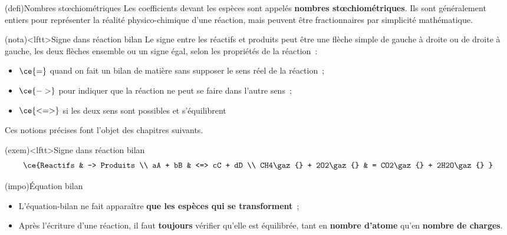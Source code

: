 \documentclass[../../main/main.tex]{subfiles}
\begin{document}
\begin{tcb*}(defi){Nombres stœchiométriques}
	Les coefficients devant les espèces sont appelés \textbf{nombres
		stœchiométriques}. Ils sont généralement entiers pour représenter la réalité
	physico-chimique d'une réaction, mais peuvent être fractionnaires par
	simplicité mathématique.
\end{tcb*}

\begin{tcb}(nota)<lftt>{Signe dans réaction bilan}
	Le signe entre les réactifs et produits
	peut être une flèche simple de gauche à droite ou de droite à gauche,
	les deux flèches ensemble ou un signe égal, selon les propriétés de la
	réaction~:
	\begin{itemize}
		\item $\ce{=}$ quand on fait un bilan de matière sans supposer le sens réel de
		      la réaction~;
		\item $\ce{->}$ pour indiquer que la réaction ne peut se faire dans l'autre
		      sens~;
		\item $\ce{<=>}$ si les deux sens sont possibles et s'équilibrent
	\end{itemize}
	Ces notions précises font l'objet des chapitres suivants.
\end{tcb}

\begin{tcb}(exem)<lftt>{Signe dans réaction bilan}
	\vspace{-15pt}
	\begin{align*}
		\ce{Reactifs          & -> Produits
		\\
		aA + bB               & <=> cC + dD
		\\
		CH4\gaz{} + 2O2\gaz{} & = CO2\gaz{} + 2H2O\gaz{}
		}%
	\end{align*}
\end{tcb}

\begin{tcb}[label=impo:eqbil](impo){Équation bilan}
	\begin{itemize}
		\item L'équation-bilan ne fait apparaître \textbf{que les espèces qui se
			      transforment}~;
		\item Après l'écriture d'une réaction, il faut \textbf{toujours}
		      vérifier qu'elle est équilibrée, tant en \textbf{nombre d'atome}
		      qu'en \textbf{nombre de charges}.
	\end{itemize}
\end{tcb}
\end{document}
